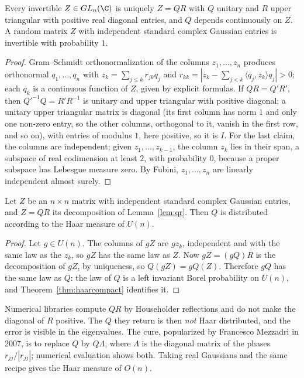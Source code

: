 \begin{lemma}\label{lem:qr}
Every invertible $Z\in GL_n(\C)$ is uniquely $Z=QR$ with $Q$ unitary and $R$ upper triangular with positive real diagonal entries, and $Q$ depends continuously on $Z$. A random
matrix $Z$ with independent standard complex Gaussian entries is invertible with probability $1$.
\end{lemma}

\begin{proof}
Gram--Schmidt orthonormalization of the columns $z_1,\dots,z_n$ produces orthonormal $q_1,\dots,q_n$ with $z_k=\sum_{j\le k}r_{jk}q_j$ and $r_{kk}=|z_k-\sum_{j<k}\langle q_j,z_k\rangle q_j|>0$; each $q_k$
is a continuous function of $Z$, given by explicit formulas. If $QR=Q'R'$, then $Q'^{-1}Q=R'R^{-1}$ is unitary and upper triangular with positive diagonal; a unitary upper triangular
matrix is diagonal (its first column has norm $1$ and only one non-zero entry, so the other columns, orthogonal to it, vanish in the first row, and so on), with entries of modulus $1$,
here positive, so it is $I$. For the last claim, the columns are independent; given $z_1,\dots,z_{k-1}$, the column $z_k$ lies in their span, a subspace of real codimension at least
$2$, with probability $0$, because a proper subspace has Lebesgue measure zero. By Fubini, $z_1,\dots,z_n$ are linearly independent almost surely.
\end{proof}

\begin{theorem}\label{thm:qrhaar}
Let $Z$ be an $n\times n$ matrix with independent standard complex Gaussian entries, and $Z=QR$ its decomposition of Lemma~\ref{lem:qr}. Then $Q$ is distributed according to the Haar measure of $U(n)$.
\end{theorem}

\begin{proof}
Let $g\in U(n)$. The columns of $gZ$ are $gz_k$, independent and with the same law as the $z_k$, so $gZ$ has the same law as $Z$. Now $gZ=(gQ)R$ is the decomposition of $gZ$, by
uniqueness, so $Q(gZ)=gQ(Z)$. Therefore $gQ$ has the same law as $Q$: the law of $Q$ is a left invariant Borel probability on $U(n)$, and Theorem~\ref{thm:haarcompact} identifies it.
\end{proof}

\begin{remark}
Numerical libraries compute $QR$ by Householder reflections and do not make the diagonal of $R$ positive. The $Q$ they return is then \emph{not} Haar distributed, and the error is
visible in the eigenvalues. The cure, popularized by Francesco Mezzadri in 2007, is to replace $Q$ by $Q\Lambda$, where $\Lambda$ is the diagonal matrix of the phases $r_{jj}/|r_{jj}|$;
numerical evaluation shows both. Taking real Gaussians and the same recipe gives the Haar measure of $O(n)$.
\end{remark}

